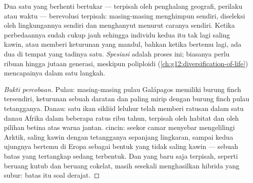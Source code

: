 \begin{proposition}[Spesiasi]\label{prop:g12:selection-drift-speciation:speciation}
Dua  satu  yang berhenti bertukar  --- terpisah oleh
penghalang geografi, perilaku atau waktu --- berevolusi terpisah:
masing-masing menghimpun  sendiri, diseleksi oleh
lingkungannya sendiri dan menghanyut menurut caranya sendiri. Ketika
perbedaannya sudah cukup jauh sehingga individu kedua  itu tak
lagi saling kawin, atau memberi keturunan yang mandul, bahkan ketika
bertemu lagi, ada dua  di tempat yang tadinya satu.
\emph{Spesiasi} adalah proses ini; biasanya perlu
ribuan hingga jutaan generasi, meskipun poliploidi
(\cref{ch:g12:diversification-of-life}) mencapainya dalam satu langkah.
\end{proposition}
\begin{proof}[Bukti percobaan]
Pulau: masing-masing pulau Galápagos memiliki burung finch tersendiri,
keturunan sebuah  daratan dan paling mirip dengan burung finch
pulau tetangganya. Danau: satu ikan sikliid leluhur telah memberi
ratusan  dalam satu danau Afrika dalam beberapa ratus ribu
tahun, terpisah oleh habitat dan oleh pilihan betina atas warna
jantan.  cincin:  seekor camar menyebar mengelilingi
Arktik, saling kawin dengan tetangganya sepanjang lingkaran, sampai
kedua ujungnya bertemu di Eropa sebagai bentuk yang tidak saling kawin
--- sebuah batas  yang tertangkap sedang terbentuk. Dan 
yang baru saja terpisah, seperti beruang kutub dan beruang cokelat,
masih sesekali menghasilkan hibrida yang subur: batas itu soal derajat.
\end{proof}

